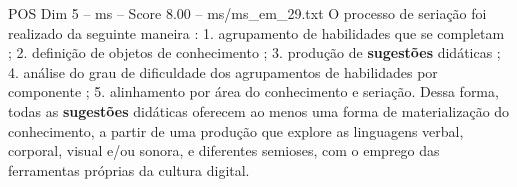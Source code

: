 \begin{textsample}{POS Dim 5 – ms – Score 8.00 – ms/ms\_em\_29.txt}
O processo de seriação foi realizado da seguinte maneira : 1. agrupamento de habilidades que se completam ; 2. definição de objetos de conhecimento ; 3. produção de \textbf{sugestões} didáticas ; 4. análise do grau de dificuldade dos agrupamentos de habilidades por componente ; 5. alinhamento por área do conhecimento e seriação.
Dessa forma, todas as \textbf{sugestões} didáticas oferecem ao menos uma forma de materialização do conhecimento, a partir de uma produção que explore as linguagens verbal, corporal, visual e/ou sonora, e diferentes semioses, com o emprego das ferramentas próprias da cultura digital.

\end{textsample}
